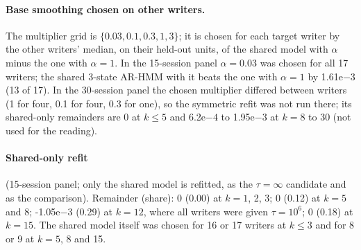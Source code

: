 \documentclass[10pt]{article}
\newcommand{\e}[2]{#1e$#2$}
\newcommand{\arthree}{\mbox{3-state} \mbox{AR-HMM}}
\begin{document}
\paragraph{Base smoothing chosen on other writers.} The multiplier grid is $\{0.03, 0.1, 0.3, 1, 3\}$; it is chosen for each target writer by the other writers' median, on their held-out units, of the shared model with $\alpha$ minus the one with $\alpha=1$. In the 15-session panel $\alpha=0.03$ was chosen for all 17 writers; the shared \arthree{} with it beats the one with $\alpha=1$ by \e{1.61}{-3} (13 of 17). In the 30-session panel the chosen multiplier differed between writers (1 for four, 0.1 for four, 0.3 for one), so the symmetric refit was not run there; its shared-only remainders are 0 at $k\le5$ and \e{6.2}{-4} to \e{1.95}{-3} at $k=8$ to 30 (not used for the reading).

\paragraph{Shared-only refit} (15-session panel; only the shared model is refitted, as the $\tau=\infty$ candidate and as the comparison). Remainder (share): 0 (0.00) at $k=1$, 2, 3; 0 (0.12) at $k=5$ and 8; \e{-1.05}{-3} (0.29) at $k=12$, where all writers were given $\tau=10^6$; 0 (0.18) at $k=15$. The shared model itself was chosen for 16 or 17 writers at $k\le3$ and for 8 or 9 at $k=5$, 8 and 15.
\end{document}
